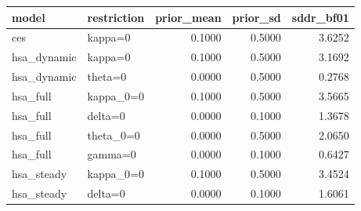 \begin{tabular}{llrrr}
\toprule
model & restriction & prior\_mean & prior\_sd & sddr\_bf01 \\
\midrule
ces & kappa=0 & 0.1000 & 0.5000 & 3.6252 \\
hsa\_dynamic & kappa=0 & 0.1000 & 0.5000 & 3.1692 \\
hsa\_dynamic & theta=0 & 0.0000 & 0.5000 & 0.2768 \\
hsa\_full & kappa\_0=0 & 0.1000 & 0.5000 & 3.5665 \\
hsa\_full & delta=0 & 0.0000 & 0.1000 & 1.3678 \\
hsa\_full & theta\_0=0 & 0.0000 & 0.5000 & 2.0650 \\
hsa\_full & gamma=0 & 0.0000 & 0.1000 & 0.6427 \\
hsa\_steady & kappa\_0=0 & 0.1000 & 0.5000 & 3.4524 \\
hsa\_steady & delta=0 & 0.0000 & 0.1000 & 1.6061 \\
\bottomrule
\end{tabular}

